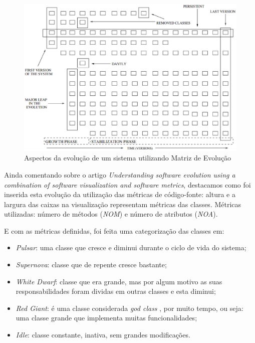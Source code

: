 \begin{figure}[!htb]
  \centering
    \includegraphics[keepaspectratio=true,scale=0.5]
    {figuras/evolutionMatrixAspects.eps}
  \caption{Aspectos da evolução de um sistema utilizando Matriz de Evolução
  \cite{Lanza02understandingsoftware}}
  \label{fig:evolutionMatrixAspects}
\end{figure}


Ainda comentando sobre o artigo \textit{Understanding software evolution using
a combination of software visualization and software metrics}, destacamos
como foi inserida esta evolução da utilização das métricas de código-fonte:
altura e a largura das caixas na visualização representam métricas das
classes. Métricas utilizadas: número de métodos (\textit{NOM}) e número de
atributos (\textit{NOA}).

E com as métricas definidas, foi feita uma categorização das classes em:

\begin{itemize}
  \item \textit{Pulsar}: uma classe que cresce e diminui durante o ciclo de
  vida do sistema;
  \item \textit{Supernova}: classe que de repente cresce bastante;
  \item \textit{White Dwarf}: classe que era grande, mas por algum motivo as
  suas responsabilidades foram dividas em outras classes e esta diminui;
  \item \textit{Red Giant}: é uma classe considerada \textit{god class}
  \cite{riel1996object}, por muito tempo, ou seja: uma classe grande que
  implementa muitas funcionalidades;
  \item \textit{Idle}: classe constante, inativa, sem grandes modificações.
\end{itemize}

